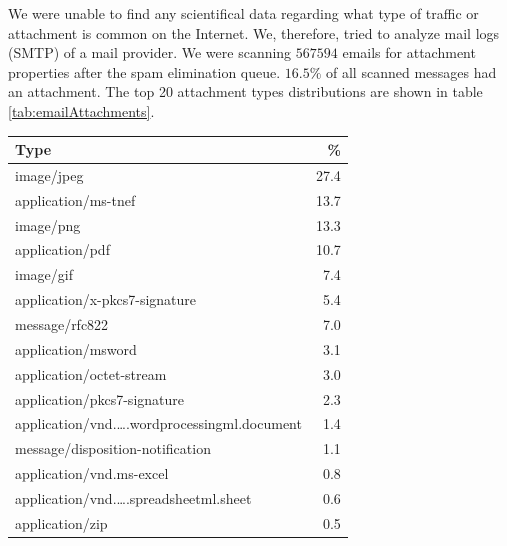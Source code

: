 We were unable to find any scientifical data regarding what type of traffic or attachment is common on the Internet. We, therefore, tried to analyze mail logs (SMTP) of a mail provider. We were scanning $567594$ emails for attachment properties after the spam elimination queue. $16.5\%$ of all scanned messages had an attachment. The top 20 attachment types distributions are shown in table \ref{tab:emailAttachments}.
\begin{table}[H]
	
	\begin{tabular}{l|r}\hline
		Type                                                                        & \%\\\hline
		image/jpeg                                                                  &    27.4\\
		application/ms-tnef                                                            &    13.7\\
		image/png                                                                   &    13.3\\
		application/pdf                                                             &    10.7\\
		image/gif                                                                   &    7.4\\
		application/x-pkcs7-signature                                               &    5.4\\
		message/rfc822                                                              &    7.0\\
		application/msword                                                          &    3.1\\
		application/octet-stream                                                    &    3.0\\
		application/pkcs7-signature                                                 &    2.3\\
		application/vnd.\ldots.wordprocessingml.document                            &     1.4\\
		message/disposition-notification                                            &    1.1\\
		application/vnd.ms-excel                                                    &    0.8\\
		application/vnd.\ldots.spreadsheetml.sheet                                  &    0.6\\
		application/zip                                                             &    0.5\\

\end{tabular}
\end{table}
